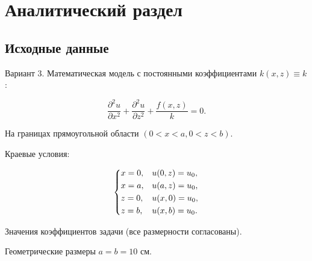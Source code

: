 \chapter{Аналитический раздел}

\section{Исходные данные}

Вариант 3. Математическая модель с постоянными коэффициентами $k(x, z) \equiv k$:

\begin{equation}
	\frac{\partial^2 u}{\partial x^2} + \frac{\partial^2 u}{\partial z^2} + \frac{f(x, z)}{k} = 0.
\end{equation}

На границах прямоугольной области $(0 < x < a, 0 < z < b)$.

\begin{center}
\end{center}

Краевые условия:

\begin{equation}
	\begin{dcases}
		x = 0, & u(0, z) = u_0, \\
		x = a, & u(a, z) = u_0, \\
		z = 0, & u(x, 0) = u_0, \\
		z = b, & u(x, b) = u_0. \\
	\end{dcases}
\end{equation}

Значения коэффициентов задачи (все размерности согласованы).

Геометрические размеры $a = b = 10$ см.

